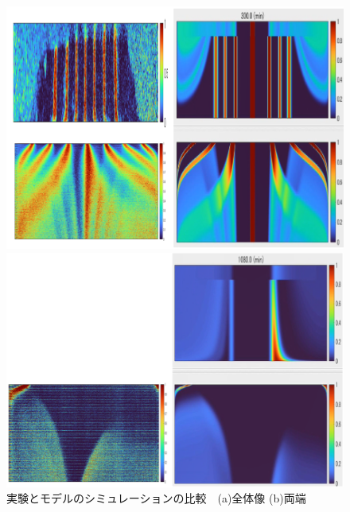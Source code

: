 \documentclass[prl,twocolumn,superscriptaddress]{revtex4}
\begin{document}
\begin{figure}[t]
	\begin{minipage}[t]{0.95\linewidth}
		\centering
		\includegraphics[width=\textwidth]{figure/24_exp_and_simu.png}
	\end{minipage}
	\begin{minipage}[t]{0.95\linewidth}
		\centering
		\includegraphics[width=\textwidth]{figure/38_exp_and_simu.png}
	\end{minipage}
	\caption{実験とモデルのシミュレーションの比較　(a)全体像 (b)両端}
	\label{fig:simu}
\end{figure}
\end{document}
